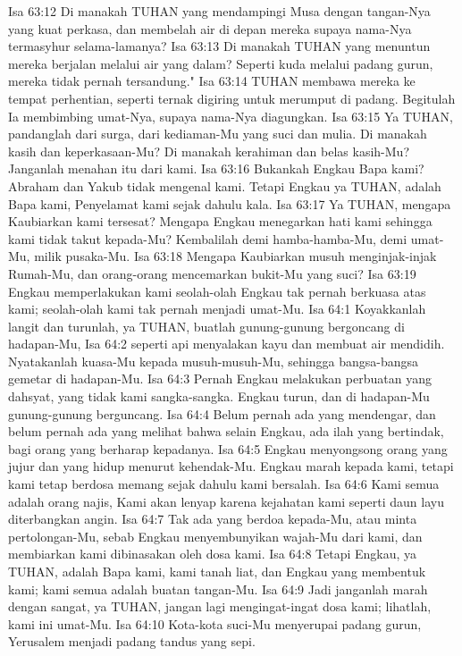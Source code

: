 Isa 63:12  Di manakah TUHAN yang mendampingi Musa dengan tangan-Nya yang kuat perkasa, dan membelah air di depan mereka supaya nama-Nya termasyhur selama-lamanya?
Isa 63:13  Di manakah TUHAN yang menuntun mereka berjalan melalui air yang dalam? Seperti kuda melalui padang gurun, mereka tidak pernah tersandung."
Isa 63:14  TUHAN membawa mereka ke tempat perhentian, seperti ternak digiring untuk merumput di padang. Begitulah Ia membimbing umat-Nya, supaya nama-Nya diagungkan.
Isa 63:15  Ya TUHAN, pandanglah dari surga, dari kediaman-Mu yang suci dan mulia. Di manakah kasih dan keperkasaan-Mu? Di manakah kerahiman dan belas kasih-Mu? Janganlah menahan itu dari kami.
Isa 63:16  Bukankah Engkau Bapa kami? Abraham dan Yakub tidak mengenal kami. Tetapi Engkau ya TUHAN, adalah Bapa kami, Penyelamat kami sejak dahulu kala.
Isa 63:17  Ya TUHAN, mengapa Kaubiarkan kami tersesat? Mengapa Engkau menegarkan hati kami sehingga kami tidak takut kepada-Mu? Kembalilah demi hamba-hamba-Mu, demi umat-Mu, milik pusaka-Mu.
Isa 63:18  Mengapa Kaubiarkan musuh menginjak-injak Rumah-Mu, dan orang-orang mencemarkan bukit-Mu yang suci?
Isa 63:19  Engkau memperlakukan kami seolah-olah Engkau tak pernah berkuasa atas kami; seolah-olah kami tak pernah menjadi umat-Mu.
Isa 64:1  Koyakkanlah langit dan turunlah, ya TUHAN, buatlah gunung-gunung bergoncang di hadapan-Mu,
Isa 64:2  seperti api menyalakan kayu dan membuat air mendidih. Nyatakanlah kuasa-Mu kepada musuh-musuh-Mu, sehingga bangsa-bangsa gemetar di hadapan-Mu.
Isa 64:3  Pernah Engkau melakukan perbuatan yang dahsyat, yang tidak kami sangka-sangka. Engkau turun, dan di hadapan-Mu gunung-gunung berguncang.
Isa 64:4  Belum pernah ada yang mendengar, dan belum pernah ada yang melihat bahwa selain Engkau, ada ilah yang bertindak, bagi orang yang berharap kepadanya.
Isa 64:5  Engkau menyongsong orang yang jujur dan yang hidup menurut kehendak-Mu. Engkau marah kepada kami, tetapi kami tetap berdosa memang sejak dahulu kami bersalah.
Isa 64:6  Kami semua adalah orang najis, Kami akan lenyap karena kejahatan kami seperti daun layu diterbangkan angin.
Isa 64:7  Tak ada yang berdoa kepada-Mu, atau minta pertolongan-Mu, sebab Engkau menyembunyikan wajah-Mu dari kami, dan membiarkan kami dibinasakan oleh dosa kami.
Isa 64:8  Tetapi Engkau, ya TUHAN, adalah Bapa kami, kami tanah liat, dan Engkau yang membentuk kami; kami semua adalah buatan tangan-Mu.
Isa 64:9  Jadi janganlah marah dengan sangat, ya TUHAN, jangan lagi mengingat-ingat dosa kami; lihatlah, kami ini umat-Mu.
Isa 64:10  Kota-kota suci-Mu menyerupai padang gurun, Yerusalem menjadi padang tandus yang sepi.
